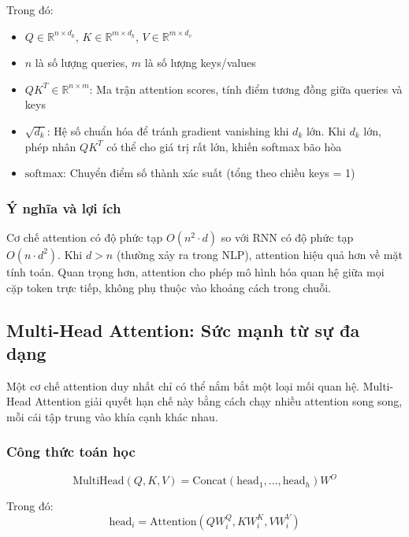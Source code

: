     Trong đó:
    \begin{itemize}
        \item $Q \in \mathbb{R}^{n \times d_k}$, $K \in \mathbb{R}^{m \times d_k}$, $V \in \mathbb{R}^{m \times d_v}$
        \item $n$ là số lượng queries, $m$ là số lượng keys/values
        \item $QK^T \in \mathbb{R}^{n \times m}$: Ma trận attention scores, tính điểm tương đồng giữa queries và keys
        \item $\sqrt{d_k}$: Hệ số chuẩn hóa để tránh gradient vanishing khi $d_k$ lớn. Khi $d_k$ lớn, phép nhân $QK^T$ có thể cho giá trị rất lớn, khiến softmax bão hòa
        \item $\text{softmax}$: Chuyển điểm số thành xác suất (tổng theo chiều keys = 1)
    \end{itemize}
    
    \subsubsection{Ý nghĩa và lợi ích}
    Cơ chế attention có độ phức tạp $O(n^2 \cdot d)$ so với RNN có độ phức tạp $O(n \cdot d^2)$. Khi $d > n$ (thường xảy ra trong NLP), attention hiệu quả hơn về mặt tính toán. Quan trọng hơn, attention cho phép mô hình hóa quan hệ giữa mọi cặp token trực tiếp, không phụ thuộc vào khoảng cách trong chuỗi.
    
    \subsection{Multi-Head Attention: Sức mạnh từ sự đa dạng}
    \label{ssec:multi_head_attention}
    
    Một cơ chế attention duy nhất chỉ có thể nắm bắt một loại mối quan hệ. Multi-Head Attention giải quyết hạn chế này bằng cách chạy nhiều attention song song, mỗi cái tập trung vào khía cạnh khác nhau.
    
    \subsubsection{Công thức toán học}
    \begin{equation}
    \text{MultiHead}(Q, K, V) = \text{Concat}(\text{head}_1, ..., \text{head}_h)W^O
    \label{eq:multihead}
    \end{equation}
    
    Trong đó:
    \begin{equation}
    \text{head}_i = \text{Attention}(QW_i^Q, KW_i^K, VW_i^V)
    \label{eq:head_i}
    \end{equation}
    
